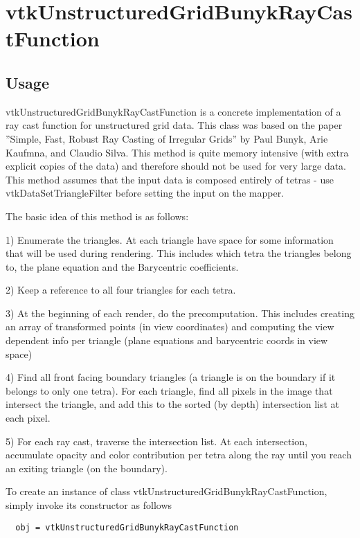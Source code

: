 \section{vtkUnstructuredGridBunykRayCastFunction}

\subsection{Usage}

 vtkUnstructuredGridBunykRayCastFunction is a concrete implementation of a
 ray cast function for unstructured grid data. This class was based on the
 paper ''Simple, Fast, Robust Ray Casting of Irregular Grids'' by Paul Bunyk,
 Arie Kaufmna, and Claudio Silva. This method is quite memory intensive 
 (with extra explicit copies of the data) and therefore should not be used
 for very large data. This method assumes that the input data is composed
 entirely of tetras - use vtkDataSetTriangleFilter before setting the input
 on the mapper.

 The basic idea of this method is as follows:

   1) Enumerate the triangles. At each triangle have space for some 
      information that will be used during rendering. This includes 
      which tetra the triangles belong to, the plane equation and the  
      Barycentric coefficients.

   2) Keep a reference to all four triangles for each tetra.

   3) At the beginning of each render, do the precomputation. This 
      includes creating an array of transformed points (in view 
      coordinates) and computing the view dependent info per triangle
      (plane equations and barycentric coords in view space)

   4) Find all front facing boundary triangles (a triangle is on the
      boundary if it belongs to only one tetra). For each triangle,
      find all pixels in the image that intersect the triangle, and
      add this to the sorted (by depth) intersection list at each 
      pixel.

   5) For each ray cast, traverse the intersection list. At each
      intersection, accumulate opacity and color contribution
      per tetra along the ray until you reach an exiting triangle
      (on the boundary). 


To create an instance of class vtkUnstructuredGridBunykRayCastFunction, simply
invoke its constructor as follows
\begin{verbatim}
  obj = vtkUnstructuredGridBunykRayCastFunction
\end{verbatim}
